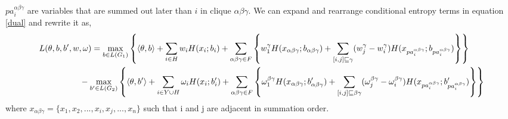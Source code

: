 \documentclass{article}
\begin{document}
$pa_i^{\alpha\beta\gamma}$ are variables that are summed out later than $i$ in clique $\alpha\beta\gamma$.
We can expand and rearrange conditional entropy terms in equation \ref{dual} and rewrite it as,
\begin{align*}
L(\theta,b,b',w,\omega)&= \max_{b\in L(G_1)}  \left\{ \langle \theta,b \rangle+\sum_{i\in H}w_iH(x_i;b_i)+\sum_{\alpha\beta\gamma\in F} \left\{ w_1^{\gamma}H(x_{\alpha\beta\gamma};b_{\alpha\beta\gamma})+\sum_{[i,j]\sqsubseteq \gamma}(w_j^{\gamma}-w_i^{\gamma})H(x_{pa_i^{\alpha\beta\gamma}};b_{pa_i^{\alpha\beta\gamma}}) \right \}\right \} \nonumber \\&\hspace{-5mm}- \max_{b'\in L(G_2)}  \left\{ \langle \theta,b' \rangle+\sum_{i\in Y\cup H}\omega_iH(x_i;b'_i)+\sum_{\alpha\beta\gamma\in F}\left\{ \omega_1^{\beta\gamma}H(x_{\alpha\beta\gamma};b'_{\alpha\beta\gamma})+\sum_{[i,j]\sqsubseteq \beta\gamma}(\omega_j^{\beta\gamma}-\omega_i^{\beta\gamma})H(x_{pa_i^{\alpha\beta\gamma}};b'_{pa_i^{\alpha\beta\gamma}}) \right \}  \right\}
\end{align*}
where $x_{\alpha\beta\gamma}=\{x_1,x_2,...,x_i,x_j,...,x_n\}$ such that i and j are adjacent in summation order. 
\end{document}
